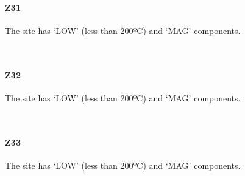 \documentclass[11pt]{article}
\begin{document}
    \begin{center}
    \end{center}
    { \hspace*{\fill} \\}
    
    \newpage
    
    \paragraph{Z31}\label{z31}

    The site has `LOW' (less than 200ºC) and `MAG' components.



    \begin{center}
    \end{center}
    { \hspace*{\fill} \\}
    
    \newpage
    
    \paragraph{Z32}\label{z32}

    The site has `LOW' (less than 200ºC) and `MAG' components.



    \begin{center}
    \end{center}
    { \hspace*{\fill} \\}
    
    \newpage
    
    \paragraph{Z33}\label{z33}

    The site has `LOW' (less than 200ºC) and `MAG' components.



    \begin{center}
    \end{center}
    { \hspace*{\fill} \\}
    
\end{document}
